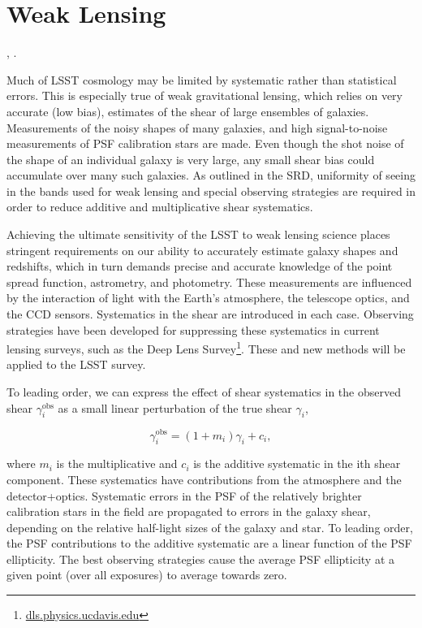 %
%

\newcommand{\red}[1]{\textcolor{red}{#1}}

\clearpage
\section{Weak Lensing}
\def\secname{wl}\label{sec:\secname}

,
.

Much of LSST cosmology may be limited by systematic rather than statistical
errors.  This is especially true of weak gravitational lensing, which relies on
very accurate (\ie low bias), estimates of the shear of large ensembles of
galaxies. Measurements of the noisy shapes of many galaxies, and high
signal-to-noise measurements of PSF calibration stars are made.   Even though
the shot noise of the shape of an individual galaxy is very large, any small
shear bias could accumulate over many such galaxies.  As outlined in the SRD,
uniformity of seeing in the bands used for weak lensing and special observing
strategies are required in order to reduce additive and multiplicative shear
systematics.

Achieving the ultimate sensitivity of the LSST to weak lensing science places
stringent requirements on our ability to accurately estimate galaxy shapes and
redshifts, which in turn demands precise and accurate knowledge of the point
spread function, astrometry, and photometry.  These measurements are influenced
by the interaction of light with the Earth's atmosphere, the telescope optics,
and the CCD sensors.  Systematics in the shear are introduced in each case.
Observing strategies have been developed for suppressing these systematics in
current lensing surveys, such as the Deep Lens
Survey\footnote{\url{dls.physics.ucdavis.edu}}.  These and new methods will be
applied to the LSST survey.

To leading order, we can express the effect of shear systematics in the observed
shear $\gamma^\mathrm{obs}_i$ as a small linear perturbation of the true shear
$\gamma_i$,

$$ \gamma_i^\mathrm{obs} = (1+m_i) \gamma_i + c_i, $$

where $m_i$ is the multiplicative and $c_i$ is the additive systematic in the
ith shear component.  These systematics have contributions from the atmosphere
and the detector+optics.  Systematic errors in the PSF of the relatively
brighter calibration stars in the field are propagated to errors in the galaxy
shear, depending on the relative half-light sizes of the  galaxy and star.  To
leading order, the PSF contributions to the additive systematic are a linear
function of the PSF ellipticity.  The best observing strategies cause the
average PSF ellipticity at a given point (over all exposures) to average towards
zero.

